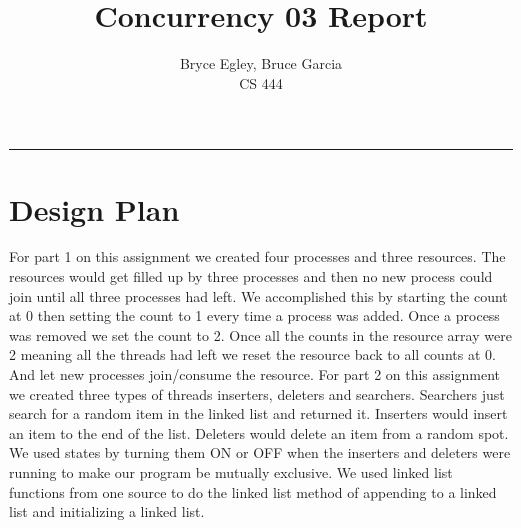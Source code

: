 \documentclass{article}
\begin{document}

\title{Concurrency 03 Report} %
\author{Bryce Egley, Bruce Garcia\\CS 444} %

\maketitle
\hrule


%
%
\section*{Design Plan}
For part 1 on this assignment we created four processes and three resources. The resources would get filled up by three processes and
then no new process could join until all three processes had left. We accomplished this by starting the count at 0 then setting the count to
1 every time a process was added. Once a process was removed we set the count to 2. Once all the counts in the resource array were 2 meaning
all the threads had left we reset the resource back to all counts at 0. And let new processes join/consume the resource.
\newline
For part 2 on this assignment we created three types of threads inserters, deleters and searchers. Searchers just search for a random item
in the linked list and returned it. Inserters would insert an item to the end of the list. Deleters would delete an item from a random spot.
We used states by turning them ON or OFF when the inserters and deleters were running to make our program be mutually exclusive. We used
linked list functions from one source to do the linked list method of appending to a linked list and initializing a linked list.
\end{document}
